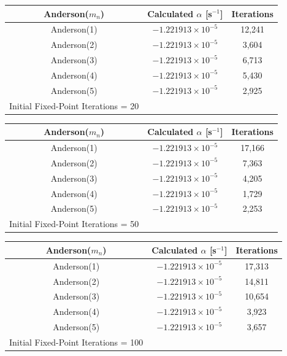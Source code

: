 \begin{table}[!htbp]\ContinuedFloat
	\begin{subtable}[h]{1.0\textwidth}
	\centering{}
	\begin{tabular}{@{}ccc@{}}\toprule
	Anderson($m_{n}$) & Calculated $\alpha$ [s$^{-1}$] & Iterations \\
	\midrule
	Anderson(1) & $-1.221913 \times 10^{-5}$ & 12,241 \\
	Anderson(2) & $-1.221913 \times 10^{-5}$ & 3,604  \\
	Anderson(3) & $-1.221913 \times 10^{-5}$ & 6,713  \\
	Anderson(4) & $-1.221913 \times 10^{-5}$ & 5,430  \\
	Anderson(5) & $-1.221913 \times 10^{-5}$ & 2,925  \\
	\bottomrule
	Initial Fixed-Point Iterations = 20
	\end{tabular}
	\end{subtable}%
	\vspace{0.25cm}
	\begin{subtable}[h]{1.0\textwidth}
	\centering{}
	\begin{tabular}{@{}ccc@{}}\toprule
	Anderson($m_{n}$) & Calculated $\alpha$ [s$^{-1}$] & Iterations \\
	\midrule
	Anderson(1) & $-1.221913 \times 10^{-5}$ & 17,166 \\
	Anderson(2) & $-1.221913 \times 10^{-5}$ & 7,363 \\
	Anderson(3) & $-1.221913 \times 10^{-5}$ & 4,205 \\
	Anderson(4) & $-1.221913 \times 10^{-5}$ & 1,729 \\
	Anderson(5) & $-1.221913 \times 10^{-5}$ & 2,253 \\
	\bottomrule
	Initial Fixed-Point Iterations = 50
	\end{tabular}
	\end{subtable}%
	\vspace{0.25cm}
	\begin{subtable}[h]{1.0\textwidth}
	\centering{}
	\begin{tabular}{@{}ccc@{}}\toprule
	Anderson($m_{n}$) & Calculated $\alpha$ [s$^{-1}$] & Iterations \\
	\midrule
	Anderson(1) & $-1.221913 \times 10^{-5}$ & 17,313 \\
	Anderson(2) & $-1.221913 \times 10^{-5}$ & 14,811 \\
	Anderson(3) & $-1.221913 \times 10^{-5}$ & 10,654 \\
	Anderson(4) & $-1.221913 \times 10^{-5}$ & 3,923 \\
	Anderson(5) & $-1.221913 \times 10^{-5}$ & 3,657 \\
	\bottomrule
	Initial Fixed-Point Iterations = 100
	\end{tabular}
	\end{subtable}
\end{table}

